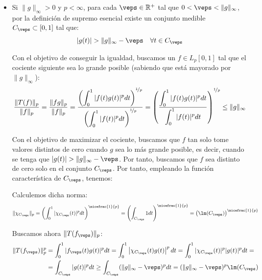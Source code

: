 \begin{ejercicio}
\begin{itemize}
    Por tanto, en este caso, $\|T\| = \|g\|_\infty$ y queda probado que sí se alcanza la norma.
    \item Si $\|g\|_\infty > 0$ y $p<\infty$, para cada $\veps\in \bb{R}^+$ tal que $0<\veps < \|g\|_\infty$, por la definición de supremo esencial existe un conjunto medible $C_\veps \subset [0, 1]$ tal que:
    \begin{equation*}
        |g(t)| > \|g\|_\infty - \veps \quad \forall t \in C_\veps
    \end{equation*}

    Con el objetivo de conseguir la igualdad, buscamos un $f \in L_p\left[0, 1\right]$ tal que el cociente siguiente sea lo grande posible (sabiendo que está mayorado por $\|g\|_\infty$):
    \begin{equation*}
        \frac{\|T(f)\|_p}{\|f\|_p} = \frac{\|fg\|_p}{\|f\|_p}
        = \dfrac{\displaystyle\left(\int_{0}^1 |f(t) g(t)|^p dt\right)^{\nicefrac{1}{p}}}{\displaystyle\left(\int_{0}^1 |f(t)|^p dt\right)^{\nicefrac{1}{p}}}
        = \left(\frac{\displaystyle\int_{0}^1 |f(t) g(t)|^p dt}{\displaystyle\int_{0}^1 |f(t)|^p dt}\right)^{\nicefrac{1}{p}}\leq \|g\|_\infty
    \end{equation*}

    Con el objetivo de maximizar el cociente, buscamos que $f$ tan solo tome valores distintos de cero cuando $g$ sea lo más grande posible, es decir, cuando se tenga que $|g(t)| > \|g\|_\infty - \veps$. Por tanto, buscamos que $f$ sea distinto de cero solo en el conjunto $C_\veps$. Por tanto, empleando la función característica de $C_\veps$, tenemos:

    Calculemos dicha norma:
    \begin{equation*}
        \|\chi_{C_\veps}\|_p = \left(\int_{0}^1 |\chi_{C_\veps}(t)|^p dt\right)^{\nicefrac{1}{p}} = \left(\int_{C_\veps} 1 dt\right)^{\nicefrac{1}{p}} = \left(\lm(C_\veps)\right)^{\nicefrac{1}{p}}
    \end{equation*}

    Buscamos ahora $\|T(f_\veps)\|_p$:
    \begin{align*}
        \|T(f_\veps)\|_p^p &= \int_{0}^1 |f_\veps(t) g(t)|^p dt = \int_{0}^1 \left|\chi_{C_\veps}(t) g(t)\right|^p dt = \int_{0}^1 |\chi_{C_\veps}(t)|^p |g(t)|^p dt =\\&=  \int_{C_\veps} |g(t)|^p dt \geq \int_{C_\veps} (\|g\|_\infty - \veps)^p dt = (\|g\|_\infty - \veps)^p \lm(C_\veps)
    \end{align*}


\end{itemize}
\end{ejercicio}

